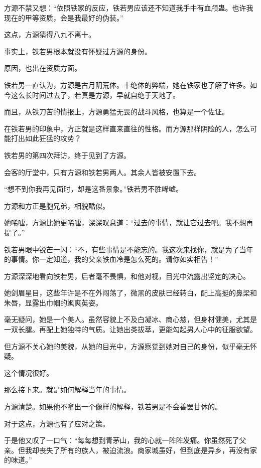 
\begin{this_body}

方源不禁又想：“依照铁家的反应，铁若男应该还不知道我手中有血颅蛊。也许我现在的甲等资质，会是我最好的伪装。”

这点，方源猜得八九不离十。

事实上，铁若男根本就没有怀疑过方源的身份。

原因，也出在资质方面。

铁若男一直认为，方源是古月阴荒体。十绝体的弊端，她在铁家也了解了许多。如今这么长时间过去了，若真是方源，早就自绝于天地了。

而且，从铁刀苦的情报上，方源勇猛无畏的战斗风格，也算是一个佐证。

在铁若男的印象中，方正就是这样直来直往的性格。而方源那样阴险的人，怎么可能打出如此狂猛的攻势？

铁若男的第四次拜访，终于见到了方源。

会客的厅堂中，只有方源和铁若男两人。其余人皆被安置下去。

“想不到你我再见面时，却是这番景象。”铁若男不胜唏嘘。

方源和方正是胞兄弟，相貌酷似。

她唏嘘，方源比她更唏嘘，深深叹息道：“过去的事情，就让它过去吧。我不想再提了。”

铁若男眼中锐芒一闪：“不，有些事情是不能忘的。我这次来找你，就是为了当年的事情。你一定知道，我的父亲铁血冷是怎么死的。请你如实相告！”

方源深深地看向铁若男，后者毫不畏惧，和他对视，目光中流露出坚定的决心。

她剑眉星目，这些年许是不在外闯荡了，微黑的皮肤已经转白，配上高挺的鼻梁和朱唇，显露出巾帼的飒爽英姿。

毫无疑问，她是一个美人。虽然容貌上不及白凝冰、商心慈，但身材健美，尤其是一双长腿。再配上她独特的气质。让她出类拔萃，更能勾起男人心中的征服欲望。

但方源不关心她的美貌，从她的目光中，方源察觉到她对自己的身份，似乎毫无怀疑。

这个情况很好。

那么接下来。就是如何解释当年的事情。

方源清楚。如果他不拿出一个像样的解释，铁若男是不会善罢甘休的。

对于这点，方源也有了应对之策。

于是他又叹了一口气：“每每想到青茅山，我的心就一阵阵发痛。你虽然死了父亲。但我却丧失了所有的族人，被迫流浪。商家城虽好，但到底是异乡，再没有家的味道。”


\end{this_body}
